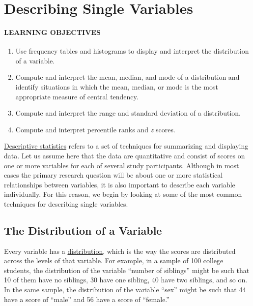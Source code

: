 \documentclass[
]{krantz}
\providecommand{\tightlist}{%
  \setlength{\itemsep}{0pt}\setlength{\parskip}{0pt}}
\begin{document}
\section{Describing Single Variables}\label{describing-single-variables}

\paragraph*{LEARNING OBJECTIVES}\label{learning-objectives-33}

\begin{enumerate}
\def\labelenumi{\arabic{enumi}.}
\tightlist
\item
  Use frequency tables and histograms to display and interpret the distribution of a variable.
\item
  Compute and interpret the mean, median, and mode of a distribution and identify situations in which the mean, median, or mode is the most appropriate measure of central tendency.
\item
  Compute and interpret the range and standard deviation of a distribution.
\item
  Compute and interpret percentile ranks and \emph{z} scores.
\end{enumerate}

\hyperref[descriptive-statistics]{Descriptive statistics} refers to a set of techniques for summarizing and displaying data. Let us assume here that the data are quantitative and consist of scores on one or more variables for each of several study participants. Although in most cases the primary research question will be about one or more statistical relationships between variables, it is also important to describe each variable individually. For this reason, we begin by looking at some of the most common techniques for describing single variables.

\subsection*{The Distribution of a Variable}\label{the-distribution-of-a-variable}


Every variable has a \hyperref[distribution]{distribution}, which is the way the scores are distributed across the levels of that variable. For example, in a sample of 100 college students, the distribution of the variable ``number of siblings'' might be such that 10 of them have no siblings, 30 have one sibling, 40 have two siblings, and so on. In the same sample, the distribution of the variable ``sex'' might be such that 44 have a score of ``male'' and 56 have a score of ``female.''
\end{document}
